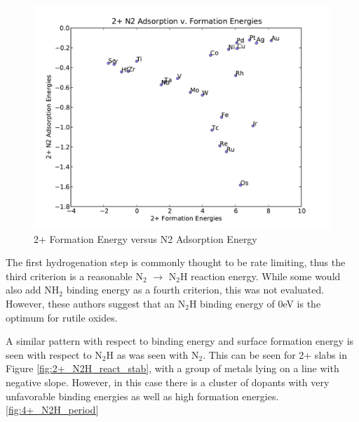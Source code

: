 \documentclass[catalysts,article,submit,moreauthors,pdftex,10pt,a4paper]{mdpi}
\theoremstyle{mdpi}
\newcounter{ex}
\newcounter{re}
\theoremstyle{mdpidefinition}
\begin{document}
\begin{figure}
    \centering
    \includegraphics[width=0.8\linewidth]{Images/2+N2_Formation.pdf}
    \caption{2+ Formation Energy versus N2 Adsorption Energy}
    \label{fig:2+_N2_react_stab}
\end{figure}

The first hydrogenation step is commonly thought to be rate limiting, thus the third criterion is a reasonable N$_2$ $\rightarrow$ N$_2$H reaction energy. While some would also add NH$_2$ binding energy as a fourth criterion\cite{}, this was not evaluated.  However, these authors suggest that an N$_2$H binding energy of 0eV is the optimum for rutile oxides. 

A similar pattern with respect to binding energy and surface formation energy is seen with respect to N$_2$H as was seen with N$_2$. This can be seen for 2+ slabs in Figure \ref{fig:2+_N2H_react_stab}, with a group of metals lying on a line with negative slope. However, in this case there is a cluster of dopants with very unfavorable binding energies as well as high formation energies. \ref{fig:4+_N2H_period}

\end{document}
